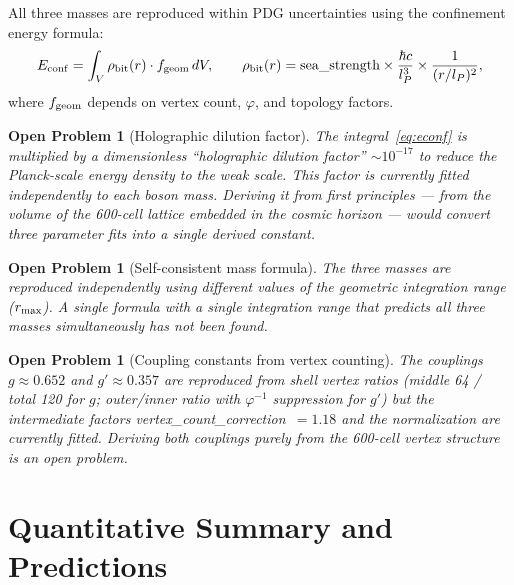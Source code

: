 \documentclass[11pt,a4paper]{article}
\newtheorem{openprob}[theorem]{Open Problem}
\newcommand{\lP}{l_P}
\newcommand{\phig}{\varphi}   %
\begin{document}
All three masses are reproduced within PDG uncertainties using the
confinement energy formula:
\begin{equation}
E_{\rm conf}
= \int_V \rho_{\rm bit}(r)\cdot f_{\rm geom}\,dV,
\qquad
\rho_{\rm bit}(r) = \text{sea\_strength}
\times\frac{\hbar c}{\lP^3}
\times\frac{1}{(r/\lP)^2},
\label{eq:econf}
\end{equation}
where $f_{\rm geom}$ depends on vertex count, $\phig$, and topology
factors.

\begin{openprob}[Holographic dilution factor]
\label{op:dilution}
The integral~\eqref{eq:econf} is multiplied by a dimensionless
``holographic dilution factor'' $\sim 10^{-17}$ to reduce the
Planck-scale energy density to the weak scale.  This factor is
currently fitted independently to each boson mass.  Deriving it
from first principles --- from the volume of the 600-cell lattice
embedded in the cosmic horizon --- would convert three parameter
fits into a single derived constant.
\end{openprob}

\begin{openprob}[Self-consistent mass formula]
\label{op:mass}
The three masses are reproduced independently using different
values of the geometric integration range ($r_{\rm max}$).  A
single formula with a single integration range that predicts all
three masses simultaneously has not been found.
\end{openprob}

\begin{openprob}[Coupling constants from vertex counting]
\label{op:coupling}
The couplings $g \approx 0.652$ and $g' \approx 0.357$ are
reproduced from shell vertex ratios (middle 64 / total 120 for $g$;
outer/inner ratio with $\phig^{-1}$ suppression for $g'$) but the
intermediate factors vertex\_count\_correction~$= 1.18$ and the
normalization are currently fitted.  Deriving both couplings purely
from the 600-cell vertex structure is an open problem.
\end{openprob}

\section{Quantitative Summary and Predictions}
\end{document}
